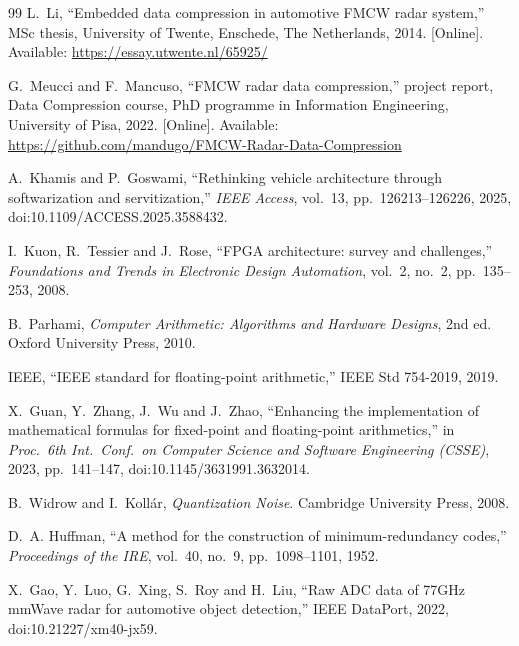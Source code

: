 \begin{thebibliography}{99}
L.~Li, ``Embedded data compression in automotive FMCW radar system,'' MSc
thesis, University of Twente, Enschede, The Netherlands, 2014. [Online].
Available: \url{https://essay.utwente.nl/65925/}

G.~Meucci and F.~Mancuso, ``FMCW radar data compression,'' project report,
Data Compression course, PhD programme in Information Engineering, University
of Pisa, 2022. [Online]. Available:
\url{https://github.com/mandugo/FMCW-Radar-Data-Compression}

A.~Khamis and P.~Goswami, ``Rethinking vehicle architecture through
softwarization and servitization,'' \emph{IEEE Access}, vol.~13,
pp.~126213--126226, 2025, doi:10.1109/ACCESS.2025.3588432.

I.~Kuon, R.~Tessier and J.~Rose, ``FPGA architecture: survey and challenges,''
\emph{Foundations and Trends in Electronic Design Automation}, vol.~2, no.~2,
pp.~135--253, 2008.

B.~Parhami, \emph{Computer Arithmetic: Algorithms and Hardware Designs}, 2nd
ed. Oxford University Press, 2010.

IEEE, ``IEEE standard for floating-point arithmetic,'' IEEE Std 754-2019, 2019.

X.~Guan, Y.~Zhang, J.~Wu and J.~Zhao, ``Enhancing the implementation of
mathematical formulas for fixed-point and floating-point arithmetics,'' in
\emph{Proc.\ 6th Int.\ Conf.\ on Computer Science and Software Engineering
(CSSE)}, 2023, pp.~141--147, doi:10.1145/3631991.3632014.

B.~Widrow and I.~Koll\'ar, \emph{Quantization Noise}. Cambridge University
Press, 2008.

D.~A. Huffman, ``A method for the construction of minimum-redundancy codes,''
\emph{Proceedings of the IRE}, vol.~40, no.~9, pp.~1098--1101, 1952.

X.~Gao, Y.~Luo, G.~Xing, S.~Roy and H.~Liu, ``Raw ADC data of 77GHz mmWave
radar for automotive object detection,'' IEEE DataPort, 2022,
doi:10.21227/xm40-jx59.

\end{thebibliography}
